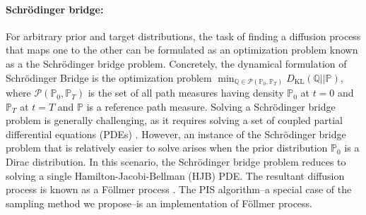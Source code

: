 \paragraph{Schr\"odinger bridge:}
For arbitrary prior and target distributions, the task of finding a diffusion process that maps one to the other can be formulated as an optimization problem known as a the Schr\"odinger bridge problem. Concretely, the dynamical formulation of Schr\"odinger Bridge is the optimization problem $\min_{\mathbb{Q}\in\mathcal{P}(\mathbb{P}_0,\mathbb{P}_T)} D_{\text{KL}}(\mathbb{Q}||\mathbb{P})$, where $\mathcal{P}(\mathbb{P}_0,\mathbb{P}_T)$ is the set of all path measures having density $\mathbb{P}_0$ at $t=0$ and $\mathbb{P}_T$ at $t=T$ and $\mathbb{P}$ is a reference path measure. Solving a Schr\"odinger bridge problem is generally challenging, as it requires solving a set of coupled partial differential equations (PDEs) \cite{chen_likelihood_2021}. However, an instance of the Schrödinger bridge problem that is relatively easier to solve arises when the prior distribution $\mathbb{P}_0$ is a Dirac distribution. In this scenario, the Schrödinger bridge problem reduces to solving a single Hamilton-Jacobi-Bellman (HJB) PDE. The resultant diffusion process is known as a F\"ollmer process \cite{follmer_time_1986}. The PIS \cite{zhang_path_2022} algorithm--a special case of the sampling method we propose--is an implementation of F\"ollmer process.